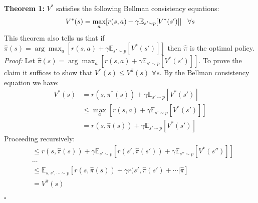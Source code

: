 \noindent\textbf{Theorem 1:} $V^*$ satisfies the following Bellman consistency equations:
\begin{align*}
V^*(s) = \max_a[r(s, a) + \gamma\mathbb{E}_{s' \sim p}[V^*(s')]] \hspace{3mm} \forall s
\end{align*}
This theorem also tells us that if $\hat{\pi}(s) = \arg\max_a [r(s, a) + \gamma\mathbb{E}_{s' \sim p}[V^*(s')]]$ then $\hat{\pi}$ is the optimal policy.\\
\textit{Proof:} Let $\hat{\pi}(s) = \arg\max_a[r(s, a) + \gamma \mathbb{E}_{s' \sim p}[V^*(s')]]$. To prove the claim it suffices to show that $V^*(s) \leq V^{\hat{\pi}}(s)$ $\forall s$. By the Bellman consistency equation we have:
\begin{align*}
    V^*(s) &= r(s, \pi^*(s)) + \gamma\mathbb{E}_{s' \sim p}[V^*(s')]\\
    & \leq \max_a [r(s, a) + \gamma \mathbb{E}_{s' \sim p}[V^*(s')]]\\
    &= r(s, \hat{\pi}(s)) + \gamma \mathbb{E}_{s' \sim p}[V^*(s')]
\end{align*}
Proceeding recursively:
\begin{align*}
    &\leq r(s, \hat{\pi}(s)) + \gamma \mathbb{E}_{s' \sim p}[r(s', \hat{\pi}(s')) + \gamma \mathbb{E}_{s'' \sim p}[V^*(s'')]]\\
    &\cdots\\
    & \leq \mathbb{E}_{s, s', \cdots \sim p}[r(s, \hat{\pi}(s)) + \gamma r(s', \hat{\pi}(s') + \cdots |\hat{\pi}] \\
    &= V^{\hat{\pi}}(s) \\
\end{align*} $\square$
\\


